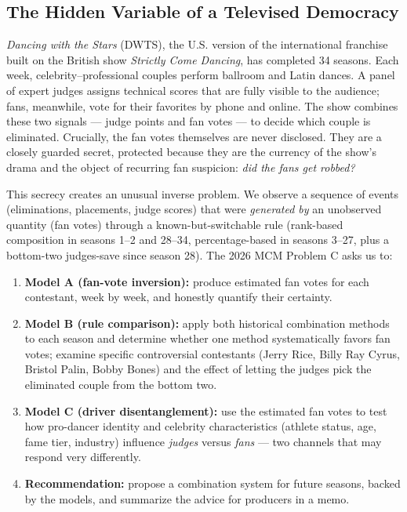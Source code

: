 \documentclass{article}
\begin{document}
\subsection{The Hidden Variable of a Televised Democracy}

\emph{Dancing with the Stars} (DWTS), the U.S. version of the international franchise built on the British show \emph{Strictly Come Dancing}, has completed 34 seasons. Each week, celebrity--professional couples perform ballroom and Latin dances. A panel of expert judges assigns technical scores that are fully visible to the audience; fans, meanwhile, vote for their favorites by phone and online. The show combines these two signals --- judge points and fan votes --- to decide which couple is eliminated. Crucially, the fan votes themselves are never disclosed. They are a closely guarded secret, protected because they are the currency of the show's drama and the object of recurring fan suspicion: \emph{did the fans get robbed?}

This secrecy creates an unusual inverse problem. We observe a sequence of events (eliminations, placements, judge scores) that were \emph{generated by} an unobserved quantity (fan votes) through a known-but-switchable rule (rank-based composition in seasons 1--2 and 28--34, percentage-based in seasons 3--27, plus a bottom-two judges-save since season 28). The 2026 MCM Problem C asks us to:

\begin{enumerate}
  \item \textbf{Model A (fan-vote inversion):} produce estimated fan votes for each contestant, week by week, and honestly quantify their certainty.
  \item \textbf{Model B (rule comparison):} apply both historical combination methods to each season and determine whether one method systematically favors fan votes; examine specific controversial contestants (Jerry Rice, Billy Ray Cyrus, Bristol Palin, Bobby Bones) and the effect of letting the judges pick the eliminated couple from the bottom two.
  \item \textbf{Model C (driver disentanglement):} use the estimated fan votes to test how pro-dancer identity and celebrity characteristics (athlete status, age, fame tier, industry) influence \emph{judges} versus \emph{fans} --- two channels that may respond very differently.
  \item \textbf{Recommendation:} propose a combination system for future seasons, backed by the models, and summarize the advice for producers in a memo.
\end{enumerate}
\end{document}

